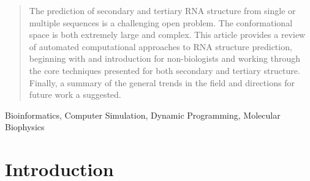 \documentclass[journal]{IEEEtran}
\begin{document}







\maketitle

\begin{abstract}
The prediction of secondary and tertiary RNA structure from single or multiple sequences is a challenging open problem. The conformational space is both extremely large and complex. This article provides a review of automated computational approaches to RNA structure prediction, beginning with and introduction for non-biologists and working through the core techniques presented for both secondary and tertiary structure. Finally, a summary of the general trends in the field and directions for future work a suggested. 
\end{abstract}

\begin{IEEEkeywords}
Bioinformatics, Computer Simulation, Dynamic Programming, Molecular Biophysics
\end{IEEEkeywords}






%
\IEEEpeerreviewmaketitle



\section{Introduction}
\label{sec:intro}
\end{document}
